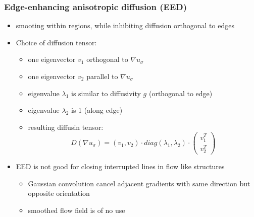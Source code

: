 \documentclass[11pt]{article}
\begin{document}
\subsubsection{Edge-enhancing anisotropic diffusion (EED)}
\label{sec-7-2-1}
\begin{itemize}
\item smooting within regions, while inhibiting diffusion orthogonal to edges
\item Choice of diffusion tensor:
\begin{itemize}
\item one eigenvector $v_1$ orthogonal to $\nabla u_\sigma$
\item one eigenvector $v_2$ parallel to $\nabla u_\sigma$
\item eigenvalue $\lambda$$_{\text{1}}$ is similar to diffusivity $g$ (orthogonal to edge)
\item eigenvalue $\lambda$$_{\text{2}}$ is 1 (along edge)
\item resulting diffusin tensor:
        \[ D(\nabla u_\sigma) = (v_1, v_2) \cdot diag(\lambda_1, \lambda_2)
	   \cdot \begin{pmatrix} v_1^T \\ v_2^T \end{pmatrix} \]
\end{itemize}
\item EED is not good for closing interrupted lines in flow like structures
\begin{itemize}
\item Gaussian convolution cancel adjacent gradients with same direction
but opposite orientation
\item smoothed flow field is of no use
\end{itemize}
\end{itemize}
\end{document}
